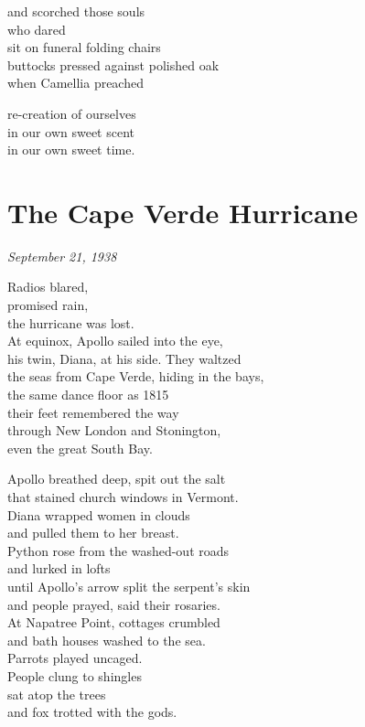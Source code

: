 \documentclass[twoside,10pt]{book}
\begin{document}
and scorched those souls\\
who dared\\
sit on funeral folding chairs\\
buttocks pressed against polished oak\\
when Camellia preached

re-creation of ourselves\\
in our own sweet scent\\
in our own sweet time.


\clearpage
\section{The Cape Verde Hurricane}

\emph{September 21, 1938}

Radios blared,\\
promised rain,\\
the hurricane was lost.\\
At equinox, Apollo sailed into the eye,\\
his twin, Diana, at his side. They waltzed\\
the seas from Cape Verde, hiding in the bays,\\
the same dance floor as 1815\\
their feet remembered the way\\
through New London and Stonington,\\
even the great South Bay.

Apollo breathed deep, spit out the salt\\
that stained church windows in Vermont.\\
Diana wrapped women in clouds\\
and pulled them to her breast.\\
Python rose from the washed-out roads\\
and lurked in lofts\\
until Apollo's arrow split the serpent's skin\\
and people prayed, said their rosaries.\\
At Napatree Point, cottages crumbled\\
and bath houses washed to the sea.\\
Parrots played uncaged.\\
People clung to shingles\\
sat atop the trees\\
and fox trotted with the gods.
\end{document}
